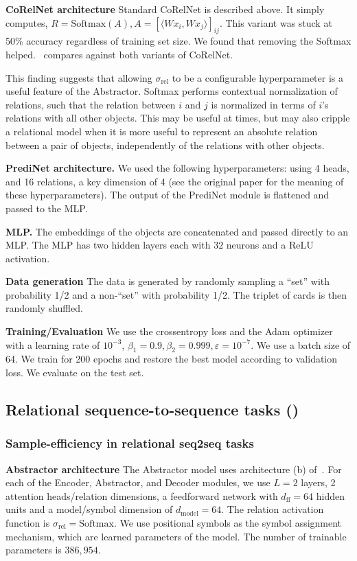 \textbf{CoRelNet architecture} Standard CoRelNet is described above. It simply computes, $R = \text{Softmax}(A), A = {\left[\langle W x_i, W x_j\rangle\right]}_{ij}$. This variant was stuck at 50\% accuracy regardless of training set size. We found that removing the Softmax helped.~ compares against both variants of CoRelNet.

This finding suggests that allowing $\sigma_{\mathrm{rel}}$ to be a configurable hyperparameter is a useful feature of the Abstractor. Softmax performs contextual normalization of relations, such that the relation between $i$ and $j$ is normalized in terms of $i$'s relations with all other objects. This may be useful at times, but may also cripple a relational model when it is more useful to represent an absolute relation between a pair of objects, independently of the relations with other objects.

\textbf{PrediNet architecture.} We used the following hyperparameters: using 4 heads, and 16 relations, a key dimension of 4 (see the original paper for the meaning of these hyperparameters). The output of the PrediNet module is flattened and passed to the MLP.

\textbf{MLP.} The embeddings of the objects are concatenated and passed directly to an MLP. The MLP has two hidden layers each with $32$ neurons and a ReLU activation.

\textbf{Data generation} The data is generated by randomly sampling a ``set'' with probability 1/2 and a non-``set'' with probability 1/2. The triplet of cards is then randomly shuffled.

\textbf{Training/Evaluation} We use the crossentropy loss and the Adam optimizer with a learning rate of $10^{-3}$, $\beta_1 = 0.9, \beta_2 = 0.999, \varepsilon = 10^{-7}$. We use a batch size of 64. We train for 200 epochs and restore the best model according to validation loss. We evaluate on the test set.


\subsection{Relational sequence-to-sequence tasks ()}

\subsubsection{Sample-efficiency in relational seq2seq tasks}

\textbf{Abstractor architecture} The Abstractor model uses architecture (b) of~. For each of the Encoder, Abstractor, and Decoder modules, we use $L = 2$ layers, 2 attention heads/relation dimensions, a feedforward network with $d_{\mathrm{ff}} = 64$ hidden units and a model/symbol dimension of $d_{\mathrm{model}} = 64$. The relation activation function is $\sigma_{\mathrm{rel}} = \mathrm{Softmax}$. We use positional symbols as the symbol assignment mechanism, which are learned parameters of the model. The number of trainable parameters is $386,954$.


